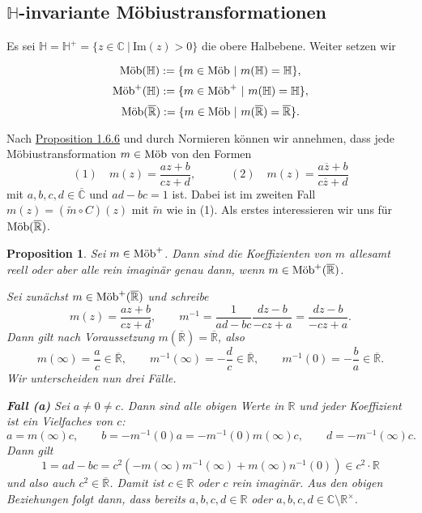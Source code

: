 \documentclass[11pt]{book}
\numberwithin{dummy}{section}
\newtheorem{proposition}[theorem]{Proposition}
\theoremstyle{nonumberbreak}
\newenvironment{pr}[1][]{\ifthenelse{\equal{#1}{}}{\proof}{\proof[#1]}\rm}{\endproof}
\newcommand{\C}{\mathbb{C}}
\newcommand{\R}{\mathbb{R}}
\newcommand{\He}{\mathbb{H}}
\newcommand{\RR}{\overline{\mathbb{R}}}
\newcommand{\CC}{\overline{\mathbb{C}}}
\newcommand{\mob}{\textup{Möb}^+}
\newcommand{\amob}{\textup{Möb}}
\newcommand{\amobh}{\textup{Möb}(\mathbb{H})}
\newcommand{\mobh}{\textup{Möb}^+(\mathbb{H})}
\newcommand{\amobr}{\textup{Möb}(\overline{\mathbb{R}})}
\newcommand{\mobr}{\textup{Möb}^+(\overline{\mathbb{R}})}
\begin{document}
\begin{spacing}{1.4}
\newpage


\section{$\mathbb{H}$-invariante Möbiustransformationen} %




Es sei $\mathbb{H}=\mathbb{H}^+= \{ z \in \C \ \vert \  \mathrm{Im}(z) >0 \}$ die obere Halbebene. Weiter setzen wir

$$\amobh := \{ m \in \amob \ \vert \ m(\He) = \He\},$$
$$\mobh := \{ m \in \mob \ \vert \ m(\He) = \He\},$$
$$\amobr := \{m \in \amob \ \vert \ m(\RR)= \RR \}.$$

Nach \hyperlink{propeinssechssechs}{Proposition 1.6.6} und durch Normieren können wir annehmen, dass jede Möbiustransformation $m \in \amob$ von den Formen
$$(1) \quad m(z) = \frac{az+b}{cz+d}, \qquad \quad (2) \quad m(z) = \frac{a\overline{z} + b}{c \overline{z} +d}$$
mit $a,b,c,d \in \CC$ und $ad-bc =1$ ist. Dabei ist im zweiten Fall $m(z) = (\tilde{m} \circ C)(z)$ mit $\tilde{m}$ wie in (1).
Als erstes interessieren wir uns für $\amobr$.

\hypertarget{propeinssiebeneins}{}
\begin{proposition}
Sei $m \in \mob$. Dann sind die Koeffizienten von $m$ allesamt reell oder aber alle rein imaginär genau dann, wenn $m \in \mobr$.

\begin{pr}
Sei zunächst $m \in \mob(\RR)$ und schreibe $$m(z)= \frac{az+b}{cz+d}, \qquad m^{-1} = \frac{1}{ad-bc} \frac{dz-b}{-cz+a} = \frac{dz-b}{-cz+a}.$$ Dann gilt nach Voraussetzung $m(\RR)=\RR$, also 
$$m(\infty) = \frac{a}{c} \in \RR, \qquad m^{-1}(\infty) = -\frac{d}{c} \in \RR, \qquad m^{-1}(0) = -\frac{b}{a} \in \RR.$$
Wir unterscheiden nun drei Fälle.
\begin{compactenum}
\item[\textbf{Fall (a)}] Sei $a \neq 0 \neq c$. Dann sind alle obigen Werte in $\R$ und jeder Koeffizient ist ein Vielfaches von $c$:
$$a= m(\infty) c, \qquad b = -m^{-1}(0) a = -m^{-1}(0) m(\infty) c, \qquad d = -m^{-1}(\infty) c.$$
Dann gilt 
$$1= ad-bc = c^2 (-m(\infty) m^{-1}(\infty) + m(\infty) n^{-1}(0)) \in c^2 \cdot \R$$
und also auch $c^2 \in \RR$. Damit ist $c \in \R$ oder $c$ rein imaginär. Aus den obigen Beziehungen folgt dann, dass bereits $a,b,c,d \in \R$ oder $a,b,c,d \in \C \setminus \R^{\times}$.


\end{compactenum}
\end{pr}
\end{proposition}
\end{spacing}
\end{document}
